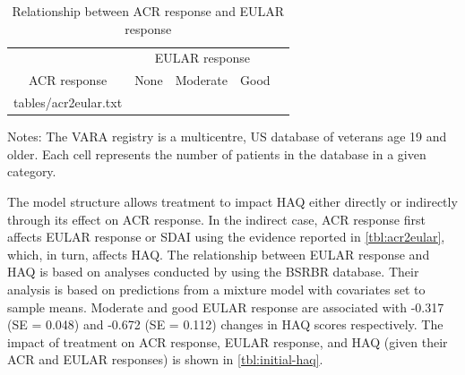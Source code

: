 \documentclass[11pt,final,fleqn]{article}\usepackage[]{graphicx}\usepackage[]{color}
\makeatletter
\theoremstyle{plain}
\newcommand*\ExpandableInput[1]{\@@input#1 }
\makeatother
\begin{document}
\begin{table}[!ht]
\begin{center}
\begin{threeparttable}
\caption{Relationship between ACR response and EULAR response} \label{tbl:acr2eular}
\begin{tabularx}{\textwidth}{@{\extracolsep{\fill}}lcccc}
\hline
\multicolumn{1}{l}{} & \multicolumn{3}{c}{EULAR response} \\
\cmidrule{2-4} 
\multicolumn{1}{c}{ACR response} & \multicolumn{1}{c}{None} & \multicolumn{1}{c}{Moderate} & \multicolumn{1}{c}{Good} \\
\hline
\ExpandableInput{tables/acr2eular.txt}
\hline
\end{tabularx}
\scriptsize
Notes: The VARA registry is a multicentre, US database of veterans age 19 and older. Each cell represents the number of patients in the 
database in a given category. 
\end{threeparttable}
\end{center}
\end{table}



The model structure allows treatment to impact HAQ either directly or indirectly through its effect on ACR response. In the indirect case, ACR response first affects EULAR response or SDAI using the evidence reported in \autoref{tbl:acr2eular}, which, in turn, affects HAQ. The relationship between EULAR response and HAQ is based on analyses conducted by \citet{stevenson2016adalimumab} using the BSRBR database. Their analysis is based on predictions from a mixture model with covariates set to sample means. Moderate and good EULAR response are associated with -0.317 (SE = 0.048) and -0.672 (SE = 0.112) changes in HAQ scores respectively. The impact of treatment on ACR response, EULAR response, and HAQ (given their ACR and EULAR responses) is shown in \autoref{tbl:initial-haq}.
\end{document}
